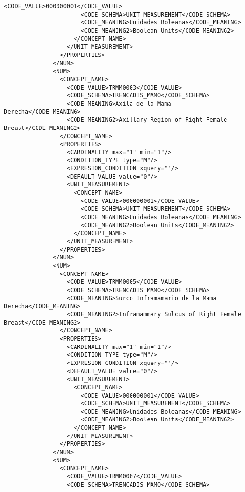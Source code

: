 \begin{lstlisting}[label=some-code,caption=Some Code]
                      <CODE_VALUE>000000001</CODE_VALUE>
                      <CODE_SCHEMA>UNIT_MEASUREMENT</CODE_SCHEMA>
                      <CODE_MEANING>Unidades Boleanas</CODE_MEANING>
                      <CODE_MEANING2>Boolean Units</CODE_MEANING2>
                    </CONCEPT_NAME>
                  </UNIT_MEASUREMENT>
                </PROPERTIES>
              </NUM>
              <NUM>
                <CONCEPT_NAME>
                  <CODE_VALUE>TRMM0003</CODE_VALUE>
                  <CODE_SCHEMA>TRENCADIS_MAMO</CODE_SCHEMA>
                  <CODE_MEANING>Axila de la Mama Derecha</CODE_MEANING>
                  <CODE_MEANING2>Axillary Region of Right Female Breast</CODE_MEANING2>
                </CONCEPT_NAME>
                <PROPERTIES>
                  <CARDINALITY max="1" min="1"/>
                  <CONDITION_TYPE type="M"/>
                  <EXPRESION_CONDITION xquery=""/>
                  <DEFAULT_VALUE value="0"/>
                  <UNIT_MEASUREMENT>
                    <CONCEPT_NAME>
                      <CODE_VALUE>000000001</CODE_VALUE>
                      <CODE_SCHEMA>UNIT_MEASUREMENT</CODE_SCHEMA>
                      <CODE_MEANING>Unidades Boleanas</CODE_MEANING>
                      <CODE_MEANING2>Boolean Units</CODE_MEANING2>
                    </CONCEPT_NAME>
                  </UNIT_MEASUREMENT>
                </PROPERTIES>
              </NUM>
              <NUM>
                <CONCEPT_NAME>
                  <CODE_VALUE>TRMM0005</CODE_VALUE>
                  <CODE_SCHEMA>TRENCADIS_MAMO</CODE_SCHEMA>
                  <CODE_MEANING>Surco Inframamario de la Mama Derecha</CODE_MEANING>
                  <CODE_MEANING2>Inframammary Sulcus of Right Female Breast</CODE_MEANING2>
                </CONCEPT_NAME>
                <PROPERTIES>
                  <CARDINALITY max="1" min="1"/>
                  <CONDITION_TYPE type="M"/>
                  <EXPRESION_CONDITION xquery=""/>
                  <DEFAULT_VALUE value="0"/>
                  <UNIT_MEASUREMENT>
                    <CONCEPT_NAME>
                      <CODE_VALUE>000000001</CODE_VALUE>
                      <CODE_SCHEMA>UNIT_MEASUREMENT</CODE_SCHEMA>
                      <CODE_MEANING>Unidades Boleanas</CODE_MEANING>
                      <CODE_MEANING2>Boolean Units</CODE_MEANING2>
                    </CONCEPT_NAME>
                  </UNIT_MEASUREMENT>
                </PROPERTIES>
              </NUM>
              <NUM>
                <CONCEPT_NAME>
                  <CODE_VALUE>TRMM0007</CODE_VALUE>
                  <CODE_SCHEMA>TRENCADIS_MAMO</CODE_SCHEMA>

\end{lstlisting}
